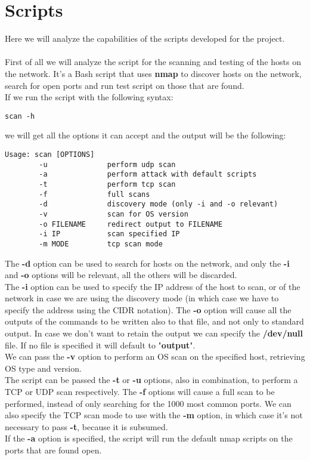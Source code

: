 \chapter{Scripts}
Here we will analyze the capabilities of the scripts developed for the project.\\\\
First of all we will analyze the script for the scanning and testing of the hosts on 
the network. It's a Bash script that uses \textbf{nmap} to discover hosts on the
network, search for open ports and run test script on those that are found.\\
If we run the script with the following syntax:
\begin{lstlisting}[numbers=none]
    scan -h
\end{lstlisting}
we will get all the options it can accept and the output will be the following:
\begin{lstlisting}[numbers=none]
    Usage: scan [OPTIONS]
        -u              perform udp scan
        -a              perform attack with default scripts
        -t              perform tcp scan
        -f              full scans
        -d              discovery mode (only -i and -o relevant)
        -v              scan for OS version
        -o FILENAME     redirect output to FILENAME
        -i IP           scan specified IP
        -m MODE         tcp scan mode
\end{lstlisting}
The \textbf{-d} option can be used to search for hosts on the network, and
only the \textbf{-i} and \textbf{-o} options will be relevant, all the others will
be discarded.\\
The \textbf{-i} option can be used to specify the IP address of the host to scan,
or of the network in case we are using the discovery mode (in which case we have to
specify the address using the CIDR notation). The \textbf{-o} option will cause 
all the outputs of the commands to be written also to that file, and not only to standard
output. In case we don't want to retain the output we can specify the \textbf{/dev/null} file.
If no file is specified it will default to "\textbf{output}".\\
We can pass the \textbf{-v} option to perform an OS scan on the specified
host, retrieving OS type and version.\\
The script can be passed the \textbf{-t} or \textbf{-u} options, also in combination,
to perform a TCP or UDP scan respectively. The \textbf{-f} options will cause a full
scan to be performed, instead of only searching for the 1000 most common ports.
We can also specify the TCP scan mode to use with the \textbf{-m} option, in which
case it's not necessary to pass \textbf{-t}, because it is subsumed.\\
If the \textbf{-a} option is specified, the script will run the default nmap scripts
on the ports that are found open.\\
\newpage